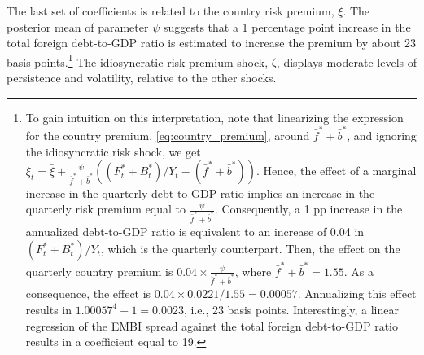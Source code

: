 \documentclass[12pt]{article}
\begin{document}
The last set of coefficients is related to the country risk premium, $\xi$. The posterior mean of parameter $\psi$ suggests that a 1 percentage point increase in the total foreign debt-to-GDP ratio is estimated to increase the premium by about 23 basis points.\footnote{To gain intuition on this interpretation, note that linearizing the expression for the country premium, \eqref{eq:country_premium}, around $\bar{f}^{\ast} + \bar{b}^{\ast}$, and ignoring the idiosyncratic risk shock, we get $\xi _{t}=\bar{\xi} + \frac{\psi}{\bar{f}^{\ast} + \bar{b}^{\ast}}((F^{\ast}_t +B_{t}^{\ast})/Y_{t}-(\bar{f}^{\ast} + \bar{b}^{\ast}))$. Hence, the effect of a marginal increase in the quarterly debt-to-GDP ratio implies an increase in the quarterly risk premium equal to $\frac{\psi}{\bar{f}^{\ast} + \bar{b}^{\ast}}$. Consequently, a  1 pp increase in the annualized debt-to-GDP ratio is equivalent to an increase of 0.04 in $(F^{\ast}_t +B_{t}^{\ast})/Y_{t}$, which is the quarterly counterpart. Then, the effect on the quarterly country premium is $0.04 \times \frac{\psi}{\bar{f}^{\ast} + \bar{b}^{\ast}}$, where $\bar{f}^{\ast} + \bar{b}^{\ast}=1.55$. As a consequence, the effect is $0.04\times 0.0221/1.55 = 0.00057$. Annualizing this effect results in $1.00057^4-1=0.0023$, i.e., 23 basis points. Interestingly, a linear regression of the EMBI spread against the total foreign debt-to-GDP ratio results in a coefficient equal to 19.}  The idiosyncratic risk premium shock, $\zeta$, displays moderate levels of persistence and volatility, relative to the other shocks.

\end{document}
